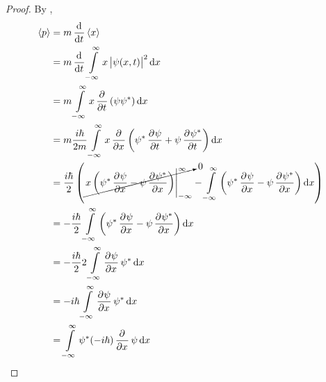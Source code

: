 \documentclass[titlepage, fleqn, a4paper, 12pt, twoside]{article}
\theoremstyle{definition}
\theoremstyle{theorem}
\begin{document}
\begin{proof}
	By ,
	\begin{align*}
		\langle p \rangle & = m \dod{}{t} \langle x \rangle                                                                                                                                                                                                                    \\
                                  & = m \dod{}{t} \int\limits_{-\infty}^{\infty} x \left| \psi(x,t) \right|^2 \dif x                                                                                                                                                                   \\
                                  & = m \int\limits_{-\infty}^{\infty} x \dpd{}{t}\left( \psi \psi^* \right) \dif x                                                                                                                                                                    \\
                                  & = m \frac{i \hbar}{2 m} \int\limits_{-\infty}^{\infty} x \dpd{}{x}\left( \psi^* \dpd{\psi}{t} + \psi \dpd{\psi^*}{t} \right) \dif x                                                                                                                \\
                                  & = \frac{i \hbar}{2} \left( \cancelto{0}{\left. x \left( \psi^* \dpd{\psi}{x} - \psi \dpd{\psi^*}{x} \right) \right|_{-\infty}^{\infty}} - \int\limits_{-\infty}^{\infty} \left( \psi^* \dpd{\psi}{x} - \psi \dpd{\psi^*}{x} \right) \dif x \right) \\
                                  & = -\frac{i \hbar}{2} \int\limits_{-\infty}^{\infty} \left( \psi^* \dpd{\psi}{x} - \psi \dpd{\psi^*}{x} \right) \dif x                                                                                                                              \\
                                  & = -\frac{i \hbar}{2} 2 \int\limits_{-\infty}^{\infty} \dpd{\psi}{x} \psi^* \dif x                                                                                                                                                                  \\
                                  & = -i \hbar \int\limits_{-\infty}^{\infty} \dpd{\psi}{x} \psi^* \dif x                                                                                                                                                                              \\
                                  & = \int\limits_{-\infty}^{\infty} \psi^* (-i \hbar) \dpd{}{x} \psi \dif x
	\end{align*}
\end{proof}
\end{document}
